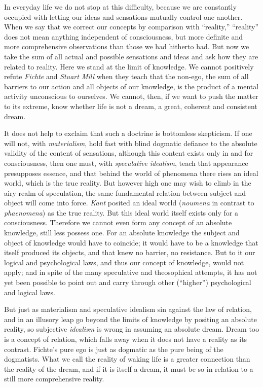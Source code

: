 \documentclass[12pt,a4paper]{book}
\newcommand{\opage}[1]{\marginnote{\footnotesize\textit{[#1]}}}
\begin{document}
In everyday life we do not stop at this difficulty, because we are
constantly occupied with letting our ideas and sensations mutually
control one another. When we say that we correct our concepts by
comparison with ``reality,'' ``reality'' does not mean anything
independent of consciousness, but more definite and more comprehensive
observations than those we had hitherto had. But now we take the sum of
all actual and possible sensations and ideas and ask how they are related
to reality. Here we stand at the limit of knowledge. We cannot positively
refute \emph{Fichte} and \emph{Stuart Mill} when they teach that the
non-ego, the sum of all barriers to our action and all objects of our
knowledge, is the product of a mental activity unconscious to ourselves.
We cannot, then, if we want to push the matter to its extreme, know
whether life is not a dream, a great, coherent and consistent dream.

It does not help to exclaim that such a doctrine is bottomless
skepticism. If one will not, with \emph{materialism}, hold fast with
blind dogmatic defiance to the absolute validity of the content of
sensations, although this content exists only in and for consciousness,
then one must, with \emph{speculative}
\opage{266}\emph{idealism}, teach that appearance presupposes essence,
and that behind the world of phenomena there rises an ideal world, which
is the true reality. But however high one may wish to climb in the
airy realm of speculation, the same fundamental relation between subject
and object will come into force. \emph{Kant} posited an ideal world
(\textit{noumena} in contrast to \textit{phaenomena}) as the true
reality. But this ideal world itself exists only for a consciousness.
Therefore we cannot even form any concept of an absolute knowledge, still
less possess one. For an absolute knowledge the subject and object of
knowledge would have to coincide; it would have to be a knowledge that
itself produced its objects, and that knew no barrier, no resistance.
But to it our logical and psychological laws, and thus our concept of
knowledge, would not apply; and in spite of the many speculative and
theosophical attempts, it has not yet been possible to point out and
carry through other (``higher'') psychological and logical laws.

But just as materialism and speculative idealism sin against the law of
relation, and in an illusory leap go beyond the limits of knowledge by
positing an absolute reality, so subjective \emph{idealism} is wrong in
assuming an absolute dream. Dream too is a concept of relation, which
falls away when it does not have a reality as its contrast. Fichte's pure
ego is just as dogmatic as the pure being of the dogmatists. What we call
the reality of waking life is a greater connection than the reality of
the dream, and if it is itself a dream, it must be so in relation to a
still more comprehensive reality.
\end{document}
